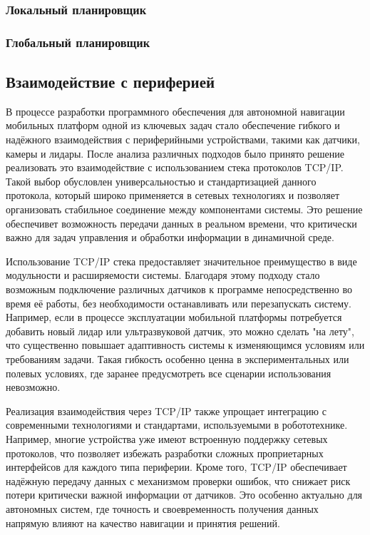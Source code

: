 \subsubsection{Локальный планировщик}



\subsubsection{Глобальный планировщик}





\subsection{Взаимодействие с периферией}

В процессе разработки программного обеспечения для автономной навигации
мобильных платформ одной из ключевых задач стало обеспечение гибкого и надёжного
взаимодействия с периферийными устройствами, такими как датчики, камеры и
лидары. После анализа различных подходов было принято решение реализовать это
взаимодействие с использованием стека протоколов TCP/IP. Такой выбор обусловлен
универсальностью и стандартизацией данного протокола, который широко применяется
в сетевых технологиях и позволяет организовать стабильное соединение между
компонентами системы. Это решение обеспечивет возможность передачи данных в
реальном времени, что критически важно для задач управления и обработки
информации в динамичной среде.

Использование TCP/IP стека предоставляет значительное преимущество в виде
модульности и расширяемости системы. Благодаря этому подходу стало возможным
подключение различных датчиков к программе непосредственно во время её работы,
без необходимости останавливать или перезапускать систему. Например, если в
процессе эксплуатации мобильной платформы потребуется добавить новый лидар или
ультразвуковой датчик, это можно сделать "на лету", что существенно повышает
адаптивность системы к изменяющимся условиям или требованиям задачи. Такая
гибкость особенно ценна в экспериментальных или полевых условиях, где заранее
предусмотреть все сценарии использования невозможно.

Реализация взаимодействия через TCP/IP также упрощает интеграцию с современными
технологиями и стандартами, используемыми в робототехнике. Например, многие
устройства уже имеют встроенную поддержку сетевых протоколов, что позволяет
избежать разработки сложных проприетарных интерфейсов для каждого типа
периферии. Кроме того, TCP/IP обеспечивает надёжную передачу данных с механизмом
проверки ошибок, что снижает риск потери критически важной информации от
датчиков. Это особенно актуально для автономных систем, где точность и
своевременность получения данных напрямую влияют на качество навигации и
принятия решений.

